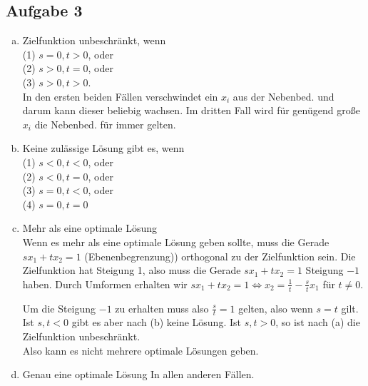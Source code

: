 \documentclass[11pt,a4paper,ngerman]{article}
\begin{document}
\subsection*{Aufgabe 3}
\begin{enumerate}[a)]
\item Zielfunktion unbeschränkt, wenn \\
(1) $s = 0, t > 0$, oder \\
(2) $s > 0, t = 0$, oder \\
(3) $s > 0, t > 0$. \\
In den ersten beiden Fällen verschwindet ein $x_i$ aus der Nebenbed. und darum kann dieser beliebig wachsen. Im dritten Fall wird für genügend große $x_i$ die Nebenbed. für immer gelten.
\item Keine zulässige Lösung gibt es, wenn \\
(1) $s < 0, t < 0$, oder \\
(2) $s < 0, t = 0$, oder \\
(3) $s = 0, t < 0$, oder \\
(4) $s = 0, t = 0$
\item Mehr als eine optimale Lösung \\
Wenn es mehr als eine optimale Lösung geben sollte, muss die Gerade $sx_1 + tx_2 = 1$ (Ebenenbegrenzung)) 
orthogonal zu der Zielfunktion sein. Die Zielfunktion hat Steigung 1, also muss die Gerade
$sx_1 + tx_2 = 1$ Steigung $-1$ haben. Durch Umformen erhalten wir
$sx_1 + tx_2 = 1 \Leftrightarrow x_2 = \frac{1}{t} - \frac{s}{t}x_1$ für $t \neq 0$.

Um die Steigung $-1$ zu erhalten muss also $\frac{s}{t} = 1$ gelten, also wenn $s = t$ gilt. Ist $s,t < 0$ gibt es aber nach (b) keine Lösung. Ist $s,t > 0$, so ist nach (a) die Zielfunktion unbeschränkt.\\
Also kann es nicht mehrere optimale Lösungen geben.
\item Genau eine optimale Lösung
In allen anderen Fällen.

%    
%
\end{enumerate}

\label{LastPage}
\end{document}
